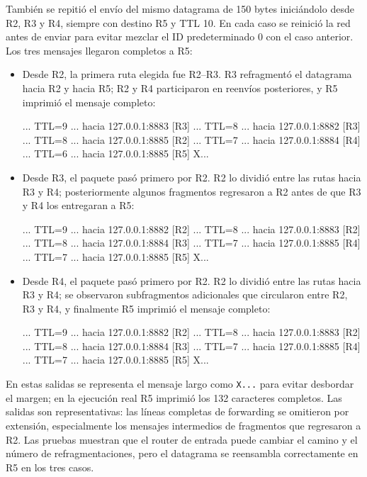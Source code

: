 \documentclass[
	spanish, %
	letterpaper, oneside
]{article}
\begin{document}
También se repitió el envío del mismo datagrama de 150 bytes iniciándolo desde R2, R3 y R4, siempre con destino R5 y TTL 10. En cada caso se reinició la red antes de enviar para evitar mezclar el ID predeterminado 0 con el caso anterior. Los tres mensajes llegaron completos a R5:
\begin{itemize}
\item Desde R2, la primera ruta elegida fue R2--R3. R3 refragmentó el datagrama hacia R2 y hacia R5; R2 y R4 participaron en reenvíos posteriores, y R5 imprimió el mensaje completo:
\begin{salida}
[R2] ... TTL=9 ... hacia 127.0.0.1:8883
[R3] ... TTL=8 ... hacia 127.0.0.1:8882
[R3] ... TTL=8 ... hacia 127.0.0.1:8885
[R2] ... TTL=7 ... hacia 127.0.0.1:8884
[R4] ... TTL=6 ... hacia 127.0.0.1:8885
[R5] X...
\end{salida}
\item Desde R3, el paquete pasó primero por R2. R2 lo dividió entre las rutas hacia R3 y R4; posteriormente algunos fragmentos regresaron a R2 antes de que R3 y R4 los entregaran a R5:
\begin{salida}
[R3] ... TTL=9 ... hacia 127.0.0.1:8882
[R2] ... TTL=8 ... hacia 127.0.0.1:8883
[R2] ... TTL=8 ... hacia 127.0.0.1:8884
[R3] ... TTL=7 ... hacia 127.0.0.1:8885
[R4] ... TTL=7 ... hacia 127.0.0.1:8885
[R5] X...
\end{salida}
\item Desde R4, el paquete pasó primero por R2. R2 lo dividió entre las rutas hacia R3 y R4; se observaron subfragmentos adicionales que circularon entre R2, R3 y R4, y finalmente R5 imprimió el mensaje completo:
\begin{salida}
[R4] ... TTL=9 ... hacia 127.0.0.1:8882
[R2] ... TTL=8 ... hacia 127.0.0.1:8883
[R2] ... TTL=8 ... hacia 127.0.0.1:8884
[R3] ... TTL=7 ... hacia 127.0.0.1:8885
[R4] ... TTL=7 ... hacia 127.0.0.1:8885
[R5] X...
\end{salida}
\end{itemize}
En estas salidas se representa el mensaje largo como \texttt{X...} para evitar desbordar el margen; en la ejecución real R5 imprimió los 132 caracteres completos. Las salidas son representativas: las líneas completas de forwarding se omitieron por extensión, especialmente los mensajes intermedios de fragmentos que regresaron a R2. Las pruebas muestran que el router de entrada puede cambiar el camino y el número de refragmentaciones, pero el datagrama se reensambla correctamente en R5 en los tres casos.
\end{document}
